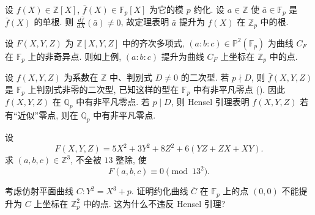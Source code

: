 \begin{example} \label{thm:1.2.13} 
设 $f(X)\in\mathbb{Z}[X]$, $\bar{f}(X)\in\mathbb{F}_p[X]$ 为它的模 $p$ 约化. 设 $a\in\mathbb{Z}$ 使 $\bar{a}\in\mathbb{F}_p$ 是 $\bar{f}(X)$ 的单根. 则 $\frac{d\bar{f}}{dX}(\bar{a})\neq 0$, 故定理表明 $\bar{a}$ 提升为 $f(X)$ 在 $\mathbb{Z}_p$ 中的根.
\end{example}

\begin{example} \label{thm:1.2.14} 
设 $F(X,Y,Z)$ 为 $\mathbb{Z}[X,Y,Z]$ 中的齐次多项式, $(a:b:c)\in\mathbb{P}^2(\mathbb{F}_p)$ 为曲线 $C_F$ 在 $\mathbb{F}_p$ 上的非奇异点. 则如上例, $(a:b:c)$ 提升为曲线 $C_F$ 上坐标在 $\mathbb{Z}_p$ 中的点.
\end{example}

\begin{example} \label{thm:1.2.15} 
设 $f(X,Y,Z)$ 为系数在 $\mathbb{Z}$ 中、判别式 $D\neq 0$ 的二次型. 若 $p\nmid D$, 则 $\bar{f}(X,Y,Z)$ 是 $\mathbb{F}_p$ 上判别式非零的二次型, 已知这样的型在 $\mathbb{F}_p$ 中有非平凡零点 (\cite[I, \S2]{serre1973}). 因此 $f(X,Y,Z)$ 在 $\mathbb{Q}_p$ 中有非平凡零点. 若 $p\mid D$, 则 Hensel 引理表明 $f(X,Y,Z)$ 若有``近似''零点, 则在 $\mathbb{Q}_p$ 中有非平凡零点.
\end{example}

\begin{exercise} \label{thm:1.2.16} 
设
\[
F(X,Y,Z) = 5X^2 + 3Y^2 + 8Z^2 + 6(YZ + ZX + XY).
\]
求 $(a,b,c)\in\mathbb{Z}^3$, 不全被 $13$ 整除, 使
\[
F(a,b,c)\equiv 0 \pmod{13^2}.
\]
\end{exercise}

\begin{exercise} \label{thm:1.2.17} 
考虑仿射平面曲线 $C\colon Y^2 = X^3 + p$. 证明约化曲线 $\bar{C}$ 在 $\mathbb{F}_p$ 上的点 $(0,0)$ 不能提升为 $C$ 上坐标在 $\mathbb{Z}_p^2$ 中的点. 这为什么不违反 Hensel 引理?
\end{exercise}


